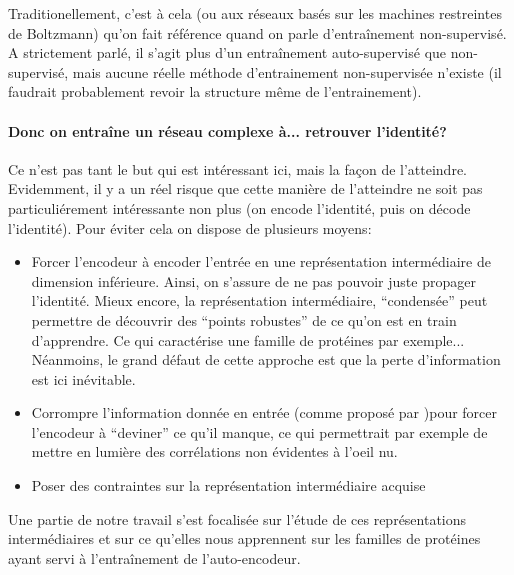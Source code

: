 \documentclass[a4paper, 11pt, onecolumn]{article}
\begin{document}
Traditionellement, c'est à cela (ou aux réseaux basés sur les machines
restreintes de Boltzmann) qu'on fait référence quand on parle d'entraînement
non-supervisé. A strictement parlé, il s'agit plus d'un entraînement
auto-supervisé que non-supervisé, mais aucune réelle méthode d'entrainement
non-supervisée n'existe (il faudrait probablement revoir la structure même de
l'entrainement).

\paragraph{Donc on entraîne un réseau complexe à... retrouver l'identité?}

Ce n'est pas tant le but qui est intéressant ici, mais la façon de l'atteindre.
Evidemment, il y a un réel risque que cette manière de l'atteindre ne soit pas
particuliérement intéressante non plus (on encode l'identité, puis on décode
l'identité). Pour éviter cela on dispose de plusieurs moyens:

\begin{itemize}
\item Forcer l'encodeur à encoder l'entrée en une représentation intermédiaire
  de dimension inférieure. Ainsi, on s'assure de ne pas pouvoir juste propager
  l'identité. Mieux encore, la représentation intermédiaire, ``condensée'' peut
  permettre de découvrir des ``points robustes'' de ce qu'on est en train
  d'apprendre. Ce qui caractérise une famille de protéines par exemple...
  Néanmoins, le grand défaut de cette approche est que la perte d'information
  est ici inévitable.
\item Corrompre l'information donnée en entrée (comme proposé par \cite{Vincent:2008:ECR:1390156.1390294})pour forcer l'encodeur à
  ``deviner'' ce qu'il manque, ce qui permettrait par exemple de mettre en
  lumière des corrélations non évidentes à l'oeil nu.
\item Poser des contraintes sur la représentation intermédiaire acquise

\end{itemize}

Une partie de notre travail s'est focalisée sur l'étude de ces représentations
intermédiaires et sur ce qu'elles nous apprennent sur les familles de protéines
ayant servi à l'entraînement de l'auto-encodeur.
\end{document}
